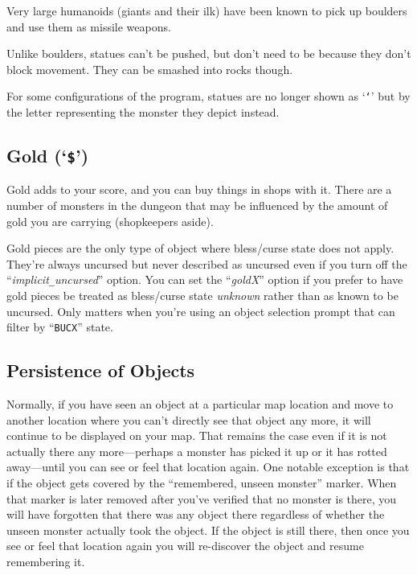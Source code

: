 Very large humanoids (giants and their ilk) have been known to pick up
boulders and use them as missile weapons.

Unlike boulders, statues can't be pushed, but don't need to be because
they don't block movement.
They can be smashed into rocks though.

For some configurations of the program, statues are no longer shown
as `{\tt `}'
but by the letter representing the monster they depict instead.

\subsection*{Gold (`{\tt \$}')}

Gold adds to your score, and you can buy things in shops with it.
There are a number
of monsters in the dungeon that may be influenced by the amount of gold
you are carrying (shopkeepers aside).

Gold pieces are the only type of object where bless/curse state does not
apply.
They're always uncursed but never described as uncursed even if you turn
off the ``{\it implicit\verb+_+uncursed\/}'' option.
You can set the ``{\it goldX\/}''
option if you prefer to have gold pieces be treated as bless/curse state
{\it unknown\/} rather than as known to be uncursed.
Only matters when you're using an object selection prompt that can filter
by ``{\tt BUCX}'' state.

\subsection*{Persistence of Objects}

Normally, if you have seen an object at a particular map location and
move to another location where you can't directly see that object any
more, it will continue to be displayed on your map.
That remains the case even if it is not actually there any
more---perhaps a monster has picked it up or it has rotted away---until
you can see or feel that location again.
One notable exception is that if the object gets covered by the
``remembered, unseen monster'' marker.
When that marker is later removed
after you've verified that no monster is there, you will have forgotten that
there was any object there regardless of whether the unseen monster
actually took the object.
If the object is still there, then once you see or feel that location
again you will re-discover the object and resume remembering it.

